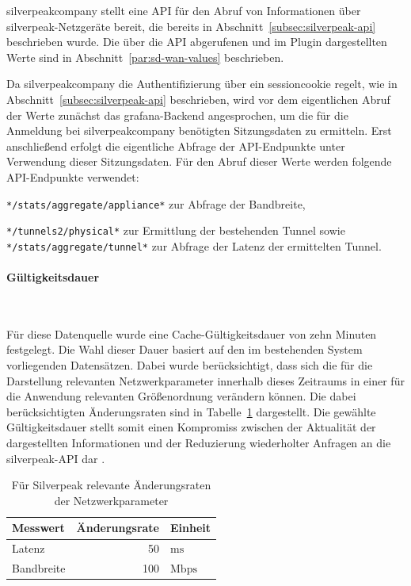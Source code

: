 \gls{silverpeakcompany} stellt eine API für den Abruf von Informationen über
\gls{silverpeak}-Netzgeräte bereit, die bereits in Abschnitt~\ref{subsec:silverpeak-api}
beschrieben wurde. Die über die API abgerufenen und im Plugin dargestellten Werte sind
in Abschnitt~\ref{par:sd-wan-values} beschrieben.

Da \gls{silverpeakcompany} die Authentifizierung über ein \gls{sessioncookie} regelt,
wie in Abschnitt~\ref{subsec:silverpeak-api} beschrieben, wird vor dem eigentlichen
Abruf der Werte zunächst das \gls{grafana}-Backend angesprochen, um die für die
Anmeldung bei \gls{silverpeakcompany} benötigten Sitzungsdaten zu ermitteln. Erst
anschließend erfolgt die eigentliche Abfrage der API-Endpunkte unter Verwendung dieser
Sitzungsdaten. Für den Abruf dieser Werte werden folgende API-Endpunkte verwendet:

\begin{compactitem}
    \item \texttt{*/stats/aggregate/appliance*} zur Abfrage der Bandbreite,
    \item \texttt{*/tunnels2/physical*} zur Ermittlung der bestehenden Tunnel sowie
          \texttt{*/stats/aggregate/tunnel*} zur Abfrage der Latenz der ermittelten Tunnel.
\end{compactitem}

\paragraph{Gültigkeitsdauer}
\label{par:silverpeak-validation-time}

~

Für diese Datenquelle wurde eine Cache-Gültigkeitsdauer von zehn Minuten festgelegt.
Die Wahl dieser Dauer basiert auf den im bestehenden System vorliegenden Datensätzen.
Dabei wurde berücksichtigt, dass sich die für die Darstellung relevanten
Netzwerkparameter innerhalb dieses Zeitraums in einer für die Anwendung relevanten
Größenordnung verändern können. Die dabei berücksichtigten Änderungsraten sind in
Tabelle~\ref{tab:silverpeak-change-rates} dargestellt. Die gewählte Gültigkeitsdauer
stellt somit einen Kompromiss zwischen der Aktualität der dargestellten Informationen
und der Reduzierung wiederholter Anfragen an die \gls{silverpeak}-API dar
\cite{grafana2026datasourcecaching}.

\begin{table}[H]
    \centering
    \begin{tabular}{lrl}
        \toprule
        \textbf{Messwert} & \textbf{Änderungsrate} & \textbf{Einheit} \\
        \midrule
        Latenz     & 50  & $\mathrm{ms}$ \\
        Bandbreite & 100 & $\mathrm{Mbps}$ \\
        \bottomrule
    \end{tabular}
    \caption{Für Silverpeak relevante Änderungsraten der Netzwerkparameter}
    \label{tab:silverpeak-change-rates}
\end{table}

